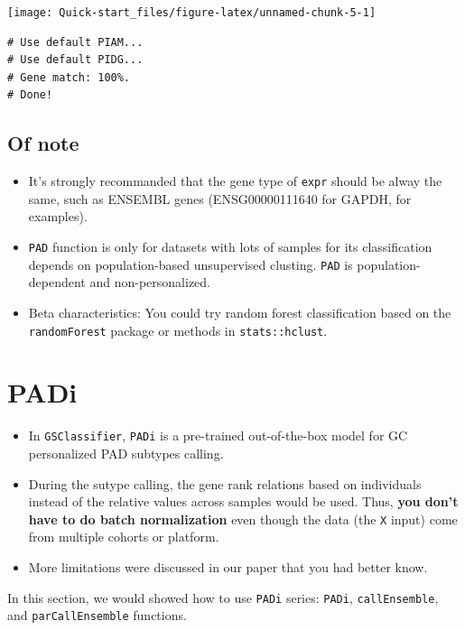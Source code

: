 \documentclass[
  12pt,
]{book}
\begin{document}
\begin{center}\texttt{[image: Quick-start\_files/figure-latex/unnamed-chunk-5-1]} \end{center}

\begin{verbatim}
# Use default PIAM... 
# Use default PIDG... 
# Gene match: 100%. 
# Done!
\end{verbatim}

\hypertarget{of-note}{%
\subsection{Of note}\label{of-note}}

\begin{itemize}
\item
  It's strongly recommanded that the gene type of \texttt{expr} should be alway the same, such as ENSEMBL genes (ENSG00000111640 for GAPDH, for examples).
\item
  \texttt{PAD} function is only for datasets with lots of samples for its classification depends on population-based unsupervised clusting. \texttt{PAD} is population-dependent and non-personalized.
\item
  Beta characteristics: You could try random forest classification based on the \texttt{randomForest} package or methods in \texttt{stats::hclust}.
\end{itemize}

\hypertarget{padi}{%
\section{PADi}\label{padi}}

\begin{itemize}
\item
  In \texttt{GSClassifier}, \texttt{PADi} is a pre-trained out-of-the-box model for GC personalized PAD subtypes calling.
\item
  During the sutype calling, the gene rank relations based on individuals instead of the relative values across samples would be used. Thus, \textbf{you don't have to do batch normalization} even though the data (the \texttt{X} input) come from multiple cohorts or platform.
\item
  More limitations were discussed in our paper that you had better know.
\end{itemize}

In this section, we would showed how to use \texttt{PADi} series: \texttt{PADi}, \texttt{callEnsemble}, and \texttt{parCallEnsemble} functions.
\end{document}
